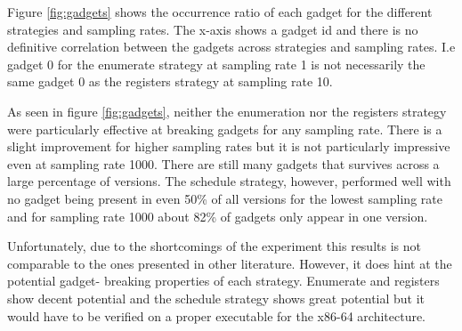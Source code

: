 Figure \ref{fig:gadgets} shows the occurrence ratio of each gadget for the different
strategies and sampling rates. The x-axis shows a gadget id and there is no definitive
correlation between the gadgets across strategies and sampling rates. I.e gadget 0 for the
enumerate strategy at sampling rate 1 is not necessarily the same gadget 0 as the registers
strategy at sampling rate 10.


As seen in figure \ref{fig:gadgets}, neither the enumeration nor the registers strategy
were particularly effective at breaking gadgets for any sampling rate. There is a slight
improvement for higher sampling rates but it is not particularly impressive even at
sampling rate 1000. There are still many gadgets that survives across a large percentage of
versions. The schedule strategy, however, performed well with no gadget being present
in even 50\% of all versions for the lowest sampling rate and for sampling rate 1000
about 82\% of gadgets only appear in one version.

Unfortunately, due to the shortcomings of the experiment this results is not comparable to
the ones presented in other literature. However, it does hint at the potential gadget-
breaking properties of each strategy. Enumerate and registers show decent potential and the
schedule strategy shows great potential but it would have to be verified on a proper
executable for the x86-64 architecture.
